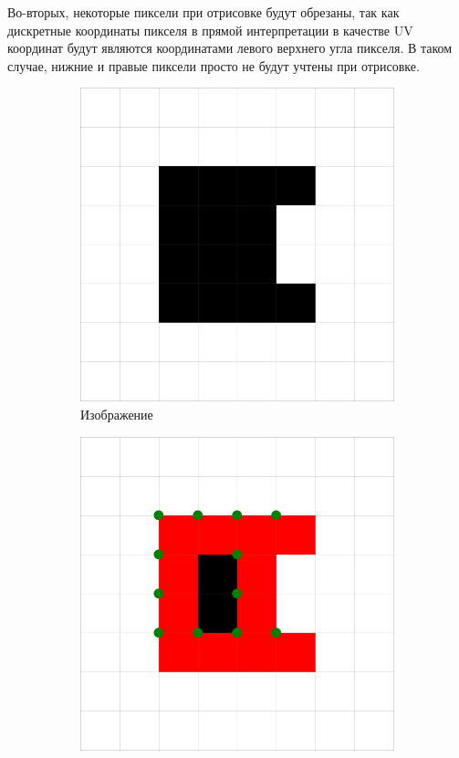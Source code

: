 \documentclass{fefu_thesis/cls/fefu}
\begin{document}
    Во-вторых, некоторые пиксели при отрисовке будут обрезаны, так как дискретные координаты пикселя в прямой интерпретации в качестве UV координат будут являются координатами левого верхнего угла пикселя. В таком случае, нижние и правые пиксели просто не будут учтены при отрисовке.

    \begin{figure}[H]
        \centering
        \begin{subfigure}[t]{.33\linewidth}
            \centering
            \includegraphics[scale=0.2]{images/SuzukiExample2.png}
            \caption{Изображение}
        \end{subfigure}
        \begin{subfigure}[t]{.33\linewidth}
            \centering
            \includegraphics[scale=0.2]{images/SuzukiExample2_uvs.png}

\end{subfigure}
\end{figure}
\end{document}
